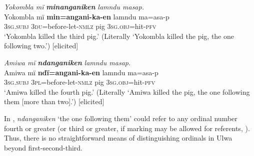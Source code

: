 \ea%
    \label{ex:det:240}
          \textit{Yokombla mï} \textbf{\textit{minanganiken}} \textit{lamndu masap.}\\
\gll    Yokombla  mï      \textbf{min=angani-ka-en}  lamndu ma=asa-p\\
    [name]    3\textsc{sg.subj}  3\textsc{du}=before-let-\textsc{nmlz}  pig    3\textsc{sg.obj}=hit-\textsc{pfv}\\
\glt `Yokombla killed the third pig.’ (Literally ‘Yokombla killed the pig, the one following   two.’) [elicited]
\z

\ea%
    \label{ex:det:241}
          \textit{Amiwa mï} \textbf{\textit{ndanganiken}} \textit{lamndu masap.}\\
\gll    Amiwa  mï      \textbf{ndï=angani-ka-en}  lamndu  ma=asa-p\\
    [name]  3\textsc{sg.subj}  3\textsc{pl}=before-let-\textsc{nmlz}  pig      3\textsc{sg.obj}=hit-\textsc{pfv}\\
\glt `Amiwa killed the fourth pig.’ (Literally ‘Amiwa killed the pig, the one following them [more than two].’) [elicited]
\z

In , \textit{ndanganiken} ‘the one following them’ could refer to any ordinal number fourth or greater (or third or greater, if  marking may be allowed for  referents, ). Thus, there is no straightforward means of distinguishing  ordinals in Ulwa beyond first-second-third.

